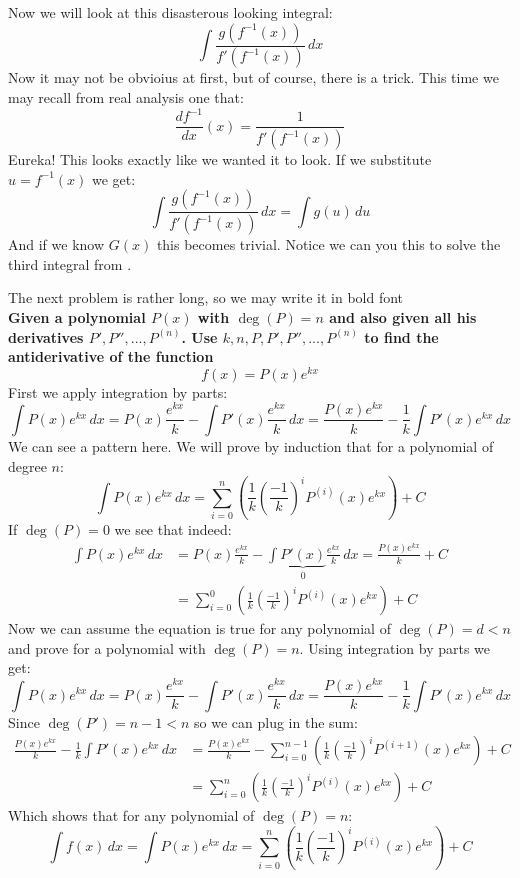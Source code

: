 \documentclass{article}
\theoremstyle{plain}
\begin{document}
	\newpage
	
	Now we will look at this disasterous looking integral:
	\[
		\int{\frac{g(f^{-1}(x))}{f'(f^{-1}(x))}\,dx}	
	\]
	Now it may not be obvioius at first, but of course, there is a trick.
	This time we may recall from real analysis one that:
	\[
		\frac{df^{-1}}{dx}(x) = \frac{1}{f'(f^{-1}(x))}
	\]
	Eureka! This looks exactly like we wanted it to look. If we substitute
	$u = f^{-1}(x)$ we get:
	\[
		\int{\frac{g(f^{-1}(x))}{f'(f^{-1}(x))}\,dx} = 
		\int{g(u)\,du}	
	\]
	And if we know $G(x)$ this becomes trivial. Notice we can you this to 
	solve the third integral from .
	
	\newpage
	
	The next problem is rather long, so we may write it in bold font
	\\
	\textbf{Given a polynomial $P(x)$ with $\deg(P)=n$ and also given all
	his derivatives $P',P'',...,P^{(n)}$. Use $k,n,P,P',P'',...,P^{(n)}$
	to find the antiderivative of the function
	\[f(x) = P(x)e^{kx}\]}
	First we apply integration by parts:
	\[
		\int{P(x)e^{kx}\,dx} = 
		P(x)\frac{e^{kx}}{k} - \int{P'(x)\frac{e^{kx}}{k}\,dx} = 
		\frac{P(x)e^{kx}}{k} - \frac{1}{k} \int{P'(x)e^{kx}\,dx}
	\]
	We can see a pattern here. We will prove by induction that for a
	polynomial of degree $n$:
	\[
		\int{P(x)e^{kx}\,dx} = \sum_{i=0}^{n}
		\left(\frac{1}{k}\left(\frac{-1}{k}\right)^{i}
		P^{(i)}(x)e^{kx}\right)+C
	\]
	If $\deg(P) = 0$ we see that indeed:
	\begin{align*}
		\int{P(x)e^{kx}\,dx} &= 
		P(x)\frac{e^{kx}}{k} - 
		\int{\underbrace{P'(x)}_0\frac{e^{kx}}{k}\,dx} = 
		\frac{P(x)e^{kx}}{k} + C \\ &=
		\sum_{i=0}^{0}
		\left(\frac{1}{k}\left(\frac{-1}{k}\right)^{i}
		P^{(i)}(x)e^{kx}\right)+C
	\end{align*}
	Now we can assume the equation is true for any polynomial of $\deg(P)=d<n$
	and prove for a polynomial with $\deg(P)=n$. 
	Using integration by parts we get: 
	\[
		\int{P(x)e^{kx}\,dx} = 
		P(x)\frac{e^{kx}}{k} - \int{P'(x)\frac{e^{kx}}{k}\,dx} = 
		\frac{P(x)e^{kx}}{k} - \frac{1}{k} \int{P'(x)e^{kx}\,dx}
	\]
	Since $\deg(P') = n - 1 < n$ so we can plug in the sum:
	\begin{align*}
		\frac{P(x)e^{kx}}{k} - \frac{1}{k} \int{P'(x)e^{kx}\,dx} &= 
		\frac{P(x)e^{kx}}{k} - \sum_{i=0}^{n-1}
		\left(\frac{1}{k}\left(\frac{-1}{k}\right)^{i}
		P^{(i+1)}(x)e^{kx}\right)+C
		\\
		&= \sum_{i=0}^{n}
		\left(\frac{1}{k}\left(\frac{-1}{k}\right)^{i}
		P^{(i)}(x)e^{kx}\right)+C
	\end{align*}
	Which shows that for any polynomial of $\deg(P) = n$:
	\[ \int{f(x)\,dx} = \int{P(x)e^{kx}\,dx} =  
		\sum_{i=0}^{n}
		\left(\frac{1}{k}\left(\frac{-1}{k}\right)^{i}
		P^{(i)}(x)e^{kx}\right)+C
	\]
	
\end{document}
